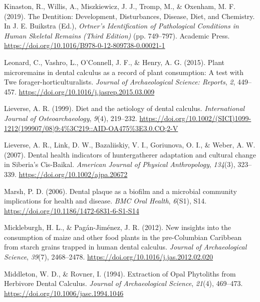 \documentclass[
  b5paper,
]{book}
\newlength{\cslhangindent}
\newenvironment{CSLReferences}[2] %
 {\begin{list}{}{%
  \setlength{\itemindent}{0pt}
  \setlength{\leftmargin}{0pt}
  \setlength{\parsep}{0pt}
  \ifodd #1
   \setlength{\leftmargin}{\cslhangindent}
   \setlength{\itemindent}{-1\cslhangindent}
  \fi
  \setlength{\itemsep}{#2\baselineskip}}}
 {\end{list}}
\begin{document}
\begin{CSLReferences}{1}{0}
Kinaston, R., Willis, A., Miszkiewicz, J. J., Tromp, M., \& Oxenham, M.
F. (2019). The {Dentition}: {Development}, {Disturbances}, {Disease},
{Diet}, and {Chemistry}. In J. E. Buikstra (Ed.), \emph{Ortner's
{Identification} of {Pathological Conditions} in {Human Skeletal
Remains} ({Third Edition})} (pp. 749--797). {Academic Press}.
\url{https://doi.org/10.1016/B978-0-12-809738-0.00021-1}

Leonard, C., Vashro, L., O'Connell, J. F., \& Henry, A. G. (2015). Plant
microremains in dental calculus as a record of plant consumption: {A}
test with {Twe} forager-horticulturalists. \emph{Journal of
Archaeological Science: Reports}, \emph{2}, 449--457.
\url{https://doi.org/10.1016/j.jasrep.2015.03.009}

Lieverse, A. R. (1999). Diet and the aetiology of dental calculus.
\emph{International Journal of Osteoarchaeology}, \emph{9}(4), 219--232.
\url{https://doi.org/10.1002/(SICI)1099-1212(199907/08)9:4\%3C219::AID-OA475\%3E3.0.CO;2-V}

Lieverse, A. R., Link, D. W., Bazaliiskiy, V. I., Goriunova, O. I., \&
Weber, A. W. (2007). Dental health indicators of
hunter\textendash gatherer adaptation and cultural change in {Siberia}'s
{Cis-Baikal}. \emph{American Journal of Physical Anthropology},
\emph{134}(3), 323--339. \url{https://doi.org/10.1002/ajpa.20672}

Marsh, P. D. (2006). Dental plaque as a biofilm and a microbial
community \textendash{} implications for health and disease. \emph{BMC
Oral Health}, \emph{6}(S1), S14.
\url{https://doi.org/10.1186/1472-6831-6-S1-S14}

Mickleburgh, H. L., \& Pagán-Jiménez, J. R. (2012). New insights into
the consumption of maize and other food plants in the pre-{Columbian
Caribbean} from starch grains trapped in human dental calculus.
\emph{Journal of Archaeological Science}, \emph{39}(7), 2468--2478.
\url{https://doi.org/10.1016/j.jas.2012.02.020}

Middleton, W. D., \& Rovner, I. (1994). Extraction of {Opal Phytoliths}
from {Herbivore Dental Calculus}. \emph{Journal of Archaeological
Science}, \emph{21}(4), 469--473.
\url{https://doi.org/10.1006/jasc.1994.1046}


\end{CSLReferences}
\end{document}
